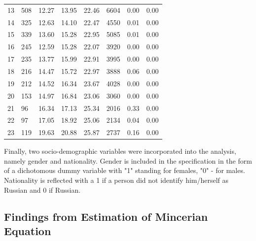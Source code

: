 \documentclass[12pt,a4paper]{article}
\numberwithin{equation}{section}
\begin{document}
\begin{table}[H]
\begin{tabular}{p{3cm}p{1.5cm}p{1.5cm}p{1.5cm}p{1.5cm}rp{1cm}p{1cm}}
   13 & 508 & 12.27 & 13.95 & 22.46 & 6604 & 0.00 & 0.00 \\ 
   14 & 325 & 12.63 & 14.10 & 22.47 & 4550 & 0.01 & 0.00 \\ 
   15 & 339 & 13.60 & 15.28 & 22.95 & 5085 & 0.01 & 0.00 \\ 
   16 & 245 & 12.59 & 15.28 & 22.07 & 3920 & 0.00 & 0.00 \\ 
   17 & 235 & 13.77 & 15.99 & 22.91 & 3995 & 0.00 & 0.00 \\ 
   18 & 216 & 14.47 & 15.72 & 22.97 & 3888 & 0.06 & 0.00 \\ 
   19 & 212 & 14.52 & 16.34 & 23.67 & 4028 & 0.00 & 0.00 \\ 
   20 & 153 & 14.97 & 16.84 & 23.06 & 3060 & 0.00 & 0.00 \\ 
   21 &  96 & 16.34 & 17.13 & 25.34 & 2016 & 0.33 & 0.00 \\ 
   22 &  97 & 17.05 & 18.92 & 25.06 & 2134 & 0.04 & 0.00 \\ 
   23 & 119 & 19.63 & 20.88 & 25.87 & 2737 & 0.16 & 0.00 \\ 
   \hline
\end{tabular}
\end{table}


Finally, two socio-demographic variables were incorporated into the analysis, namely gender and nationality. Gender is included in the specification in the form of a dichotomous dummy variable with "1" standing for females, "0" - for males. Nationality is reflected with a 1 if a person did not identify him/herself as Russian and 0 if Russian.

\subsection{Findings from Estimation of Mincerian Equation}
\end{document}
